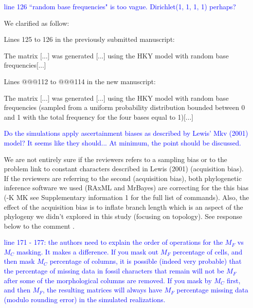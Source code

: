 \documentclass[11pt]{letter}
\begin{document}
\begin{letter}{}

\textcolor{blue}{line 126 ``random base frequencies" is too vague. Dirichlet(1, 1, 1, 1) perhaps?}

We clarified as follow:

Lines 125 to 126 in the previously submitted manuscript:

\hfill\begin{minipage}{\dimexpr\textwidth-1cm}
The matrix [...] was generated [...] using the HKY model with random base frequencies[...]
\end{minipage}

Lines @@@112 to @@@114 in the new manuscript:

\hfill\begin{minipage}{\dimexpr\textwidth-1cm}
The matrix [...] was generated [...] using the HKY model with random base frequencies (sampled from a uniform probability distribution bounded between 0 and 1 with the total frequency for the four bases equal to 1)[...]
\end{minipage}


\textcolor{blue}{Do the simulations apply ascertainment biases as described by Lewis' Mkv (2001) model? It seems like they should... At minimum, the point should be discussed.}

We are not entirely sure if the reviewers refers to a sampling bias or to the problem link to constant characters described in Lewis (2001) (acquisition bias). If the reviewers are referring to the second (acquisition bias), both phylogenetic inference software we used (RAxML and MrBayes) are correcting for the this bias (-K MK  see Supplementary information 1 for the full list of commands). Also, the effect of the acquisition bias is to inflate branch length which is an aspect of the phylogeny we didn't explored in this study (focusing on topology). See response below to the comment .


\textcolor{blue}{line 171 - 177: the authors need to explain the order of operations for the $M_F$ vs $M_C$ masking. It makes a difference. If you mask out $M_F$ percentage of cells, and then mask $M_C$ percentage of columns, it is possible (indeed very probable) that the percentage of missing data in fossil characters that remain will not be $M_F$ after some of the morphological columns are removed. If you mask by $M_C$ first, and then $M_F$, the resulting matrices will always have $M_F$ percentage missing data (modulo rounding error) in the simulated realizations.}


\end{letter}
\end{document}
